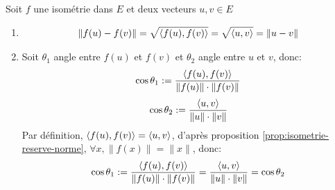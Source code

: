 \begin{preuve}
   Soit $f$ une isométrie dans  $E$ et deux vecteurs  $u, v \in E$ 
   \begin{enumerate}
       \item  
           \begin{align*}
               \|f(u) - f(v)\| = \sqrt{\langle f(u), f(v) \rangle} = \sqrt{\langle u, v \rangle} = \|u - v\| 
           \end{align*}
       \item Soit $\theta_1$ angle entre  $f(u)$ et  $f(v)$ et $\theta_2$ angle entre  $u$ et  $v$, donc:
            \[
                \cos \theta_1 := \frac{\langle f(u), f(v) \rangle}{\|f(u)\| \cdot \|f(v)\|}
           \] 
           \[
                \cos \theta_2 := \frac{\langle u, v \rangle}{\|u\| \cdot \|v\|}
           \] 
           Par définition, $\langle f(u), f(v) \rangle = \langle u, v \rangle$, d'après proposition \ref{prop:isometrie-reserve-norme},  $\forall x, \|f(x)\| = \|x\|$, donc:
           \[
                \cos \theta_1 := \frac{\langle f(u), f(v) \rangle}{\|f(u)\| \cdot \|f(v)\|} = \frac{\langle u, v \rangle}{\|u\| \cdot \|v\|} = \cos \theta_2
           \] 
   \end{enumerate}
\end{preuve}
